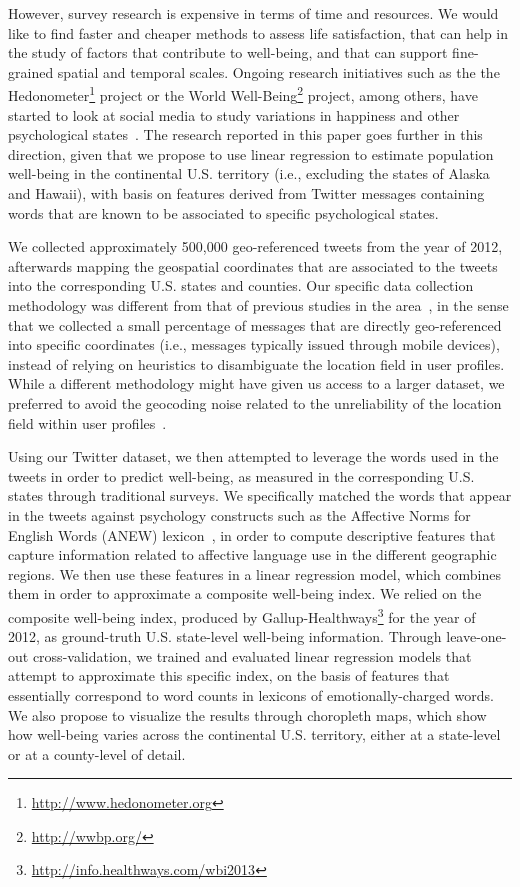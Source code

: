\documentclass{acm_proc_article-sp}
\begin{document}
However, survey research is expensive in terms of time and resources. We would like to find faster and cheaper methods to assess life satisfaction, that can help in the study of factors that contribute to well-being, and that can support fine-grained spatial and temporal scales.  Ongoing research initiatives such as the the Hedonometer\footnote{\url{http://www.hedonometer.org}} project or the World Well-Being\footnote{\url{http://wwbp.org/}} project, among others, have started to look at social media to study variations in happiness and other psychological states~\cite{Quercia:2012:TGC:2145204.2145347,Schwartz:2013:Tweets,Dodds:2011:Tweets,Bertrand:2013:Tweets}. The research reported in this paper goes further in this direction, given that we propose to use linear regression to estimate population well-being in the continental U.S. territory (i.e., excluding the states of Alaska and Hawaii), with basis on features derived from Twitter messages containing words that are known to be associated to specific psychological states.

We collected approximately 500,000 geo-referenced tweets from the year of 2012, afterwards mapping the geospatial coordinates that are associated to the tweets into the corresponding U.S. states and counties. Our specific data collection methodology was different from that of previous studies in the area~\cite{Schwartz:2013:Tweets}, in the sense that we collected a small percentage of messages that are directly geo-referenced into specific coordinates (i.e., messages typically issued through mobile devices), instead of relying on heuristics to disambiguate the location field in user profiles. While a different methodology might have given us access to a larger dataset, we preferred to avoid the geocoding noise related to the unreliability of the location field within user profiles~\cite{Hecht:2011:TJB:1978942.1978976}.

Using our Twitter dataset, we then attempted to leverage the words used in the tweets in order to predict well-being, as measured in the corresponding U.S. states through traditional surveys. We specifically matched the words that appear in the tweets against psychology constructs such as the Affective Norms for English Words (ANEW) lexicon~\cite{Bradley1999ANEW}, in order to compute descriptive features that capture information related to affective language use in the different geographic regions. We then use these features in a linear regression model, which combines them in order to approximate a composite well-being index. We relied on the composite well-being index, produced by Gallup-Healthways\footnote{\url{http://info.healthways.com/wbi2013}} for the year of 2012, as ground-truth U.S. state-level well-being information. Through leave-one-out cross-validation, we trained and evaluated linear regression models that attempt to approximate this specific index, on the basis of features that essentially correspond to word counts in lexicons of emotionally-charged words. We also propose to visualize the results through choropleth maps, which show how well-being varies across the continental U.S. territory, either at a state-level or at a county-level of detail.
\end{document}
